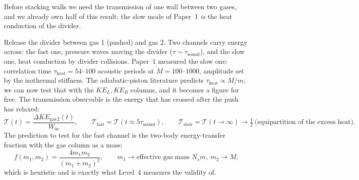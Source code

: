 \documentclass[11pt,a4paper]{article}
\begin{document}
\begin{why}
Before stacking walls we need the transmission of one wall between two gases, and we already own half of this result: the slow mode of Paper~1 \emph{is} the heat conduction of the divider.
\end{why}

Release the divider between gas 1 (pushed) and gas 2. Two channels carry energy across: the fast one, pressure waves moving the divider ($\tau \sim \tau_{\mathrm{sound}}$), and the slow one, heat conduction by divider collisions. Paper~1 measured the slow one: correlation time $\tau_{\mathrm{heat}} = 54$--$100$ acoustic periods at $M = 100$--$1000$, amplitude set by the isothermal stiffness. The adiabatic-piston literature predicts $\tau_{\mathrm{heat}} \propto M/m$; we can now test that with the $KE_L, KE_R$ columns, and it becomes a figure for free. The transmission observable is the energy that has crossed after the push has relaxed:
\begin{equation}
\mathcal T(t) = \frac{\Delta KE_{\mathrm{gas\,2}}(t)}{W_{\mathrm{in}}},\qquad
\mathcal T_{\mathrm{fast}} = \mathcal T(t \approx 5\tau_{\mathrm{sound}}),\qquad
\mathcal T_{\mathrm{slow}} = \mathcal T(t \to \infty) \to \tfrac12\ \text{(equipartition of the excess heat)}.
\label{eq:transmission}
\end{equation}
The prediction to test for the fast channel is the two-body energy-transfer fraction with the gas column as a mass:
\begin{equation}
f(m_1, m_2) = \frac{4m_1m_2}{(m_1+m_2)^2},\qquad m_1 \to \text{effective gas mass } N_s m,\ m_2 \to M,
\label{eq:twobody}
\end{equation}
which is heuristic and is exactly what Level~4 measures the validity of.
\end{document}
